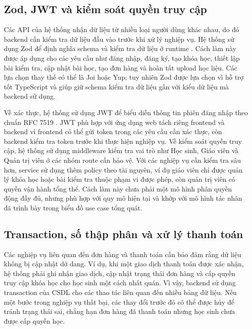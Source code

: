 \documentclass[../DoAn.tex]{subfiles}
\begin{document}
\subsection{Zod, JWT và kiểm soát quyền truy cập}
\label{subsection:3.1.4}

Các API của hệ thống nhận dữ liệu từ nhiều loại người dùng khác nhau, do đó backend cần kiểm tra dữ liệu đầu vào trước khi xử lý nghiệp vụ. Hệ thống sử dụng Zod để định nghĩa schema và kiểm tra dữ liệu ở runtime \cite{zod_docs}. Cách làm này được áp dụng cho các yêu cầu như đăng nhập, đăng ký, tạo khóa học, thiết lập bài kiểm tra, cập nhật bài học, tạo đơn hàng và hoàn tất upload học liệu. Các lựa chọn thay thế có thể là Joi hoặc Yup; tuy nhiên Zod được lựa chọn vì hỗ trợ tốt TypeScript và giúp giữ schema kiểm tra dữ liệu gần với kiểu dữ liệu mà backend sử dụng.

Về xác thực, hệ thống sử dụng JWT để biểu diễn thông tin phiên đăng nhập theo chuẩn RFC 7519 \cite{jones2015jwt}. JWT phù hợp với ứng dụng web tách riêng frontend và backend vì frontend có thể gửi token trong các yêu cầu cần xác thực, còn backend kiểm tra token trước khi thực hiện nghiệp vụ. Về kiểm soát quyền truy cập, hệ thống sử dụng middleware kiểm tra vai trò như Học sinh, Giáo viên và Quản trị viên ở các nhóm route cần bảo vệ. Với các nghiệp vụ cần kiểm tra sâu hơn, service sử dụng thêm policy theo tài nguyên, ví dụ giáo viên chỉ được quản lý khóa học hoặc bài kiểm tra thuộc phạm vi được phép, còn quản trị viên có quyền vận hành tổng thể. Cách làm này chưa phải một mô hình phân quyền động đầy đủ, nhưng phù hợp với quy mô hiện tại và khớp với mô hình tác nhân đã trình bày trong biểu đồ use case tổng quát.

\subsection{Transaction, số thập phân và xử lý thanh toán}
\label{subsection:3.1.5}

Các nghiệp vụ liên quan đến đơn hàng và thanh toán cần bảo đảm rằng dữ liệu không bị cập nhật dở dang. Ví dụ, khi một giao dịch thanh toán được xác nhận, hệ thống phải ghi nhận giao dịch, cập nhật trạng thái đơn hàng và cấp quyền truy cập khóa học cho học sinh một cách nhất quán. Vì vậy, backend sử dụng transaction của CSDL cho các thao tác liên quan đến nhiều bảng dữ liệu. Nếu một bước trong nghiệp vụ thất bại, các thay đổi trước đó có thể được hủy để tránh trạng thái sai, chẳng hạn đơn hàng đã thanh toán nhưng học sinh chưa được cấp quyền học.
\end{document}

